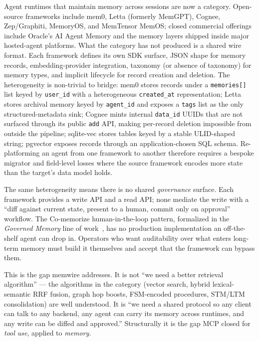 \documentclass[11pt,letterpaper,twocolumn]{article}
\begin{document}
Agent runtimes that maintain memory across sessions are now a category. Open-source frameworks include mem0, Letta (formerly MemGPT), Cognee, Zep/Graphiti, MemoryOS, and MemTensor MemOS; closed commercial offerings include Oracle's AI Agent Memory and the memory layers shipped inside major hosted-agent platforms. What the category has not produced is a shared wire format. Each framework defines its own SDK surface, JSON shape for memory records, embedding-provider integration, taxonomy (or absence of taxonomy) for memory types, and implicit lifecycle for record creation and deletion. The heterogeneity is non-trivial to bridge: mem0 stores records under a \texttt{memories[]} list keyed by \texttt{user\_id} with a heterogeneous \texttt{created\_at} representation; Letta stores archival memory keyed by \texttt{agent\_id} and exposes a \texttt{tags} list as the only structured-metadata sink; Cognee mints internal \texttt{data\_id} UUIDs that are not surfaced through its public \texttt{add} API, making per-record deletion impossible from outside the pipeline; sqlite-vec stores tables keyed by a stable ULID-shaped string; pgvector exposes records through an application-chosen SQL schema. Re-platforming an agent from one framework to another therefore requires a bespoke migrator and field-level losses where the source framework encodes more state than the target's data model holds.

The same heterogeneity means there is no shared \emph{governance} surface. Each framework provides a write API and a read API; none mediate the write with a ``diff against current state, present to a human, commit only on approval'' workflow. The Co-memorize human-in-the-loop pattern, formalized in the \emph{Governed Memory} line of work~\cite{taheri2026governed}, has no production implementation an off-the-shelf agent can drop in. Operators who want auditability over what enters long-term memory must build it themselves and accept that the framework can bypass them.

This is the gap memwire addresses. It is not ``we need a better retrieval algorithm'' --- the algorithms in the category (vector search, hybrid lexical-semantic RRF fusion, graph hop boosts, FSM-encoded procedures, STM/LTM consolidation) are well understood. It is ``we need a shared protocol so any client can talk to any backend, any agent can carry its memory across runtimes, and any write can be diffed and approved.'' Structurally it is the gap MCP closed for \emph{tool use}, applied to \emph{memory}.
\end{document}
